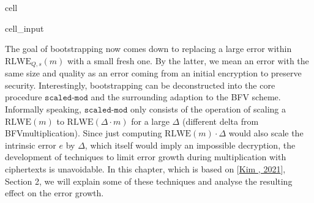 \documentclass[letterpaper,10pt,english]{jupyterBook}
\begin{document}
\begin{sphinxuseclass}{cell}\begin{sphinxVerbatimInput}

\begin{sphinxuseclass}{cell_input}
\begin{sphinxVerbatim}[commandchars=\\\{\}]
    
           
        
        
        
     \PYG{p}{[}\PYG{p}{]}
\end{sphinxVerbatim}

\end{sphinxuseclass}\end{sphinxVerbatimInput}

\end{sphinxuseclass}
\sphinxAtStartPar
The goal of bootstrapping now comes down to replacing a large error within \(\mathrm{RLWE}_{Q,s}(m)\) with a small fresh one.
By the latter, we mean an error with the same size and quality as an error coming from an initial encryption to preserve security.
Interestingly, bootstrapping can be deconstructed into the core procedure \(\texttt{scaled-mod}\) and the surrounding adaption to the BFV scheme.
Informally speaking, \(\texttt{scaled-mod}\) only consists of the operation of scaling a \(\mathrm{RLWE}(m)\) to \(\mathrm{RLWE}(\Delta \cdot m)\) for a large \(\Delta\) (different delta from BFV\sphinxhyphen{}multiplication).
Since just computing \(\mathrm{RLWE}(m) \cdot \Delta\) would also scale the intrinsic error \(e\) by \(\Delta\), which itself would imply an impossible decryption, the development of techniques to limit error growth during multiplication with ciphertexts is unavoidable.
In this chapter, which is based on {[}\hyperlink{cite.Thesis:id72}{Kim , 2021}{]}, Section 2, we will explain some of these techniques and analyse the resulting effect on the error growth.
\end{document}
